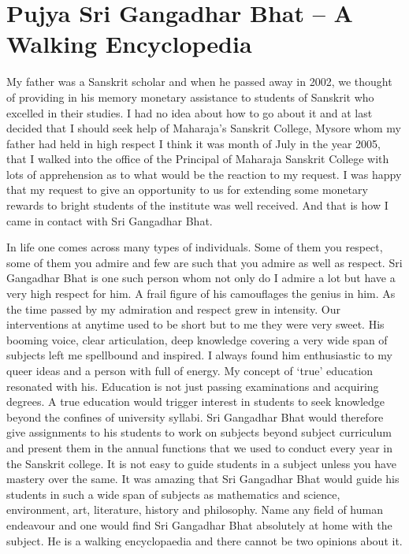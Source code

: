 \chapter{Pujya Sri Gangadhar Bhat – A Walking Encyclopedia}

\begin{center}
\end{center}

My father was a Sanskrit scholar and when he passed away in 2002, we thought of providing in his memory monetary assistance to students of Sanskrit who excelled in their studies. I had no idea about how to go about it and at last decided that I should seek help of Maharaja’s Sanskrit College, Mysore whom my father had held in high respect I think it was month of July in the year 2005, that I walked into the office of the Principal of Maharaja Sanskrit College with lots of apprehension as to what would be the reaction to my request. I was happy that my request to give an opportunity to us for extending some monetary rewards to bright students of the institute was well received. And that is how I came in contact with Sri Gangadhar Bhat.

In life one comes across many types of individuals. Some of them you respect, some of them you admire and few are such that you admire as well as respect. Sri Gangadhar Bhat is one such person whom not only do I admire a lot but have a very high respect for him. A frail figure of his camouflages the genius in him. As the time passed by my admiration and respect grew in intensity. Our interventions at anytime used to be short but to me they were very sweet. His booming voice, clear articulation, deep knowledge covering a very wide span of subjects left me spellbound and inspired. I always found him enthusiastic to my queer ideas and a person with full of energy. My concept of ‘true’ education resonated with his. Education is not just passing examinations and acquiring degrees. A true education would trigger interest in students to seek knowledge beyond the confines of university syllabi. Sri Gangadhar Bhat would therefore give assignments to his students to work on subjects beyond subject curriculum and present them in the annual functions that we used to conduct every year in the Sanskrit college. It is not easy to guide students in a subject unless you have mastery over the same. It was amazing that Sri Gangadhar Bhat would guide his students in such a wide span of subjects as mathematics and science, environment, art, literature, history and philosophy. Name any field of human endeavour and one would find Sri Gangadhar Bhat absolutely at home with the subject. He is a walking encyclopaedia and there cannot be two opinions about it. 	

